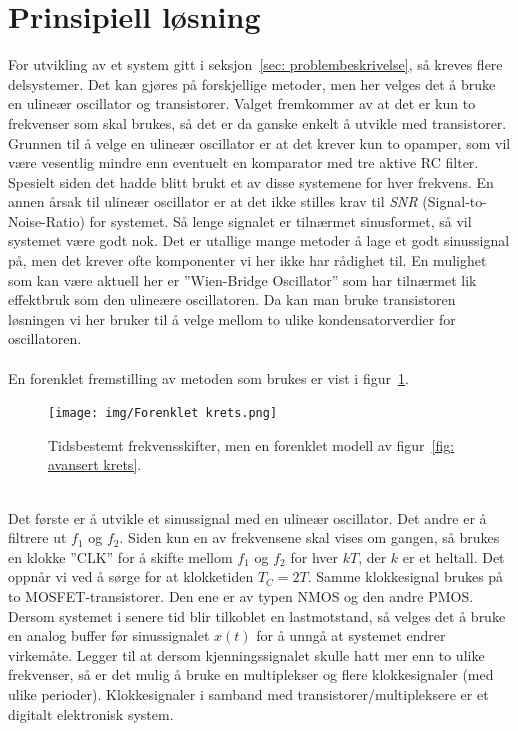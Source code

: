 \documentclass[a4paper,11pt,norsk]{article}
\begin{document}
\newpage
\section{Prinsipiell løsning}
\label{sec: prinsipiell losning}
For utvikling av et system gitt i seksjon~\ref{sec: problembeskrivelse}, så kreves flere delsystemer. Det kan gjøres på forskjellige metoder, men her velges det å bruke en ulineær oscillator og transistorer. Valget fremkommer av at det er kun to frekvenser som skal brukes, så det er da ganske enkelt å utvikle med transistorer. Grunnen til å velge en ulineær oscillator er at det krever kun to opamper, som vil være vesentlig mindre enn eventuelt en komparator med tre aktive RC filter. Spesielt siden det hadde blitt brukt et av disse systemene for hver frekvens. En annen årsak til ulineær oscillator er at det ikke stilles krav til \textit{SNR} (Signal-to-Noise-Ratio) for systemet. Så lenge signalet er tilnærmet sinusformet, så vil systemet være godt nok. Det er utallige mange metoder å lage et godt sinussignal på, men det krever ofte komponenter vi her ikke har rådighet til. En mulighet som kan være aktuell her er ''Wien-Bridge Oscillator'' som har tilnærmet lik effektbruk som den ulineære oscillatoren. Da kan man bruke transistoren løsningen vi her bruker til å velge mellom to ulike kondensatorverdier for oscillatoren. \\
\\
En forenklet fremstilling av metoden som brukes er vist i figur~\ref{fig: forenklet krets}. \\
\begin{figure}[!htbp]
    \centering
    \texttt{[image: img/Forenklet krets.png]}
    \caption{Tidsbestemt frekvensskifter, men en forenklet modell av figur~\ref{fig: avansert krets}.}
    \label{fig: forenklet krets}
\end{figure} \\
Det første er å utvikle et sinussignal med en ulineær oscillator. Det andre er å filtrere ut $f_1$ og $f_2$. Siden kun en av frekvensene skal vises om gangen, så brukes en klokke ''CLK'' for å skifte mellom $f_1$ og $f_2$ for hver $kT$, der $k$ er et heltall. Det oppnår vi ved å sørge for at klokketiden $T_C = 2T$. Samme klokkesignal brukes på to MOSFET-transistorer. Den ene er av typen NMOS og den andre PMOS. 
Dersom systemet i senere tid blir tilkoblet en lastmotstand, så velges det å bruke en analog buffer før sinussignalet $x(t)$ for å unngå at systemet endrer virkemåte. Legger til at dersom kjenningssignalet skulle hatt mer enn to ulike frekvenser, så er det mulig å bruke en multiplekser og flere klokkesignaler (med ulike perioder). Klokkesignaler i samband med transistorer/multipleksere er et digitalt elektronisk system.
\end{document}
